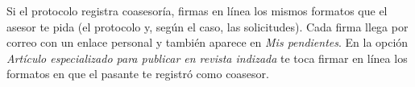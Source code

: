 \documentclass[11pt,a4paper]{article}
\begin{document}
{\small\tableofcontents}
\newpage
\begin{quevasahacer}
Si el protocolo registra coasesoría, firmas en línea los mismos formatos que el asesor te pida (el protocolo y, según el caso, las solicitudes). Cada firma llega por correo con un enlace personal y también aparece en \emph{Mis pendientes}. En la opción \emph{Artículo especializado para publicar en revista indizada} te toca firmar en línea los formatos en que el pasante te registró como coasesor.
\end{quevasahacer}



\end{document}
